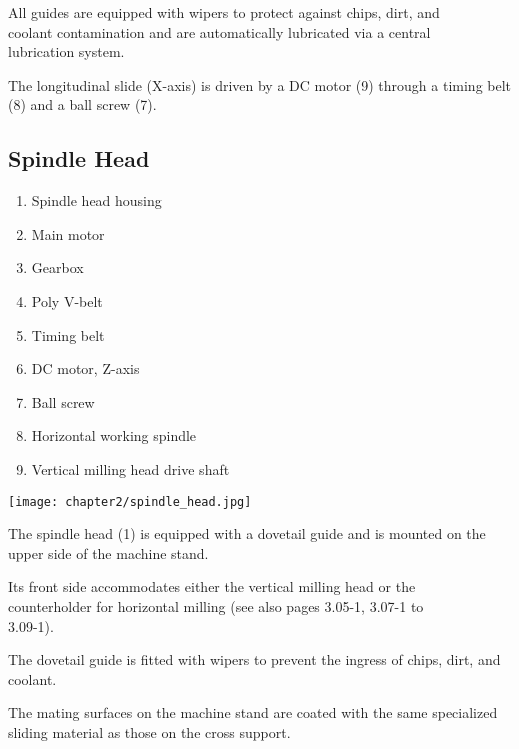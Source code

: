 All guides are equipped with wipers to protect against chips, dirt, and \\coolant contamination and are automatically lubricated via a central \\lubrication system.

The longitudinal slide (X-axis) is driven by a DC motor (9) through a timing belt (8) and a ball screw (7).

\vfill
\clearpage

\subsection{Spindle Head}

\begin{minipage}{0.5\textwidth}
    \begin{enumerate}[itemsep=1pt,parsep=0pt]
        \item Spindle head housing
        \item Main motor
        \item Gearbox
        \item Poly V-belt
        \item Timing belt
        \item DC motor, Z-axis
        \item Ball screw
        \item Horizontal working spindle
        \item Vertical milling head drive shaft
    \end{enumerate}
\end{minipage}%
\begin{minipage}{0.5\textwidth}
    \centering
    \texttt{[image: chapter2/spindle\_head.jpg]}
    \label{fig:spindle_head}
\end{minipage}

\vspace{1cm}

The spindle head (1) is equipped with a dovetail guide and is mounted on the upper side of the machine stand.

Its front side accommodates either the vertical milling head or the \\counterholder for horizontal milling (see also pages 3.05-1, 3.07-1 to \\3.09-1).

The dovetail guide is fitted with wipers to prevent the ingress of chips, dirt, and coolant.

The mating surfaces on the machine stand are coated with the same specialized sliding material as those on the cross support.


